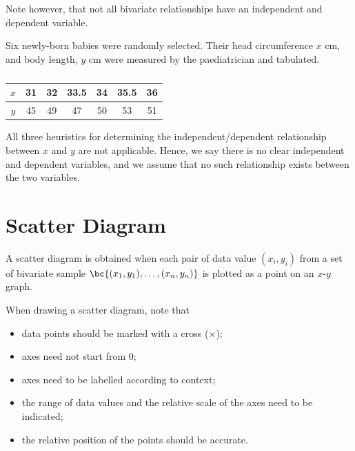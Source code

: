 Note however, that not all bivariate relationships have an independent and dependent variable.

\begin{example}
    Six newly-born babies were randomly selected. Their head circumference $x$ cm, and body length, $y$ cm were measured by the paediatrician and tabulated.

    \begin{table}[H]
        \centering
        \begin{tabular}{|c|c|c|c|c|c|c|}
        \hline
        $x$ & 31 & 32 & 33.5 & 34 & 35.5 & 36 \\ \hline
        $y$ & 45 & 49 & 47 & 50 & 53 & 51 \\ \hline
        \end{tabular}
        \caption{}
    \end{table}

    All three heuristics for determining the independent/dependent relationship between $x$ and $y$ are not applicable. Hence, we say there is no clear independent and dependent variables, and we assume that no such relationship exists between the two variables.
\end{example}

\section{Scatter Diagram}

A scatter diagram is obtained when each pair of data value $(x_i, y_i)$ from a set of bivariate sample $\bc{(x_1, y_1), \dots, (x_n, y_n)}$ is plotted as a point on an $x$-$y$ graph.

\begin{recipe}
    When drawing a scatter diagram, note that
    \begin{itemize}
        \item data points should be marked with a cross ($\times$);
        \item axes need not start from 0;
        \item axes need to be labelled according to context;
        \item the range of data values and the relative scale of the axes need to be indicated;
        \item the relative position of the points should be accurate.
    \end{itemize}
\end{recipe}

